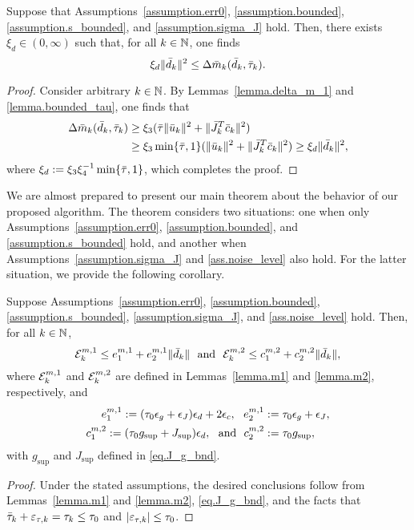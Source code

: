 \begin{lemma}\label{lemma.d_bounded_by_delta_m}
  Suppose that Assumptions~\ref{assumption.err0}, \ref{assumption.bounded}, \ref{assumption.s_bounded}, and \ref{assumption.sigma_J} hold. Then, there exists $\xi_d \in (0,\infty)$ such that, for all $k \in \mathbb{N}$, one finds
  \begin{equation*}
    \xi_d \|{\bar d}_k\|^2 \leq \Delta {\bar m}_k({\bar d}_k, {\bar \tau}_k).
  \end{equation*}
\end{lemma}
\begin{proof}
  Consider arbitrary $k \in \mathbb{N}$.  By Lemmas~\ref{lemma.delta_m_1} and \ref{lemma.bounded_tau}, one finds that
  \begin{align*}
    \Delta {\bar m}_k({\bar d}_k, {\bar \tau}_k)
    &\geq \xi_3 ({\bar \tau} \|{\bar u}_k\|^2 + \|{\bar J}_k^T {\bar c}_k\|^2) \\
    &\geq \xi_3 \min\{{\bar \tau},1\} (\|{\bar u}_k\|^2 + \|{\bar J}_k^T {\bar c}_k\|^2 ) \geq \xi_d \|{\bar d}_k \|^2,
  \end{align*}
  where $\xi_d := \xi_3 \xi_4^{-1} \min\{{\bar \tau},1\}$, which completes the proof.
\end{proof}

We are almost prepared to present our main theorem about the behavior of our proposed algorithm.  The theorem considers two situations: one when only Assumptions~\ref{assumption.err0}, \ref{assumption.bounded}, and \ref{assumption.s_bounded} hold, and another when Assumptions~\ref{assumption.sigma_J} and \ref{ass.noise_level} also hold.  For the latter situation, we provide the following corollary.

\begin{corollary}\label{cor.m1_m2_bound}
  Suppose Assumptions~\ref{assumption.err0}, \ref{assumption.bounded}, \ref{assumption.s_bounded}, \ref{assumption.sigma_J}, and \ref{ass.noise_level} hold.  Then, for all $k \in \mathbb{N}$,
  \begin{equation}\label{eq.m1_m2_bound}
    \calEkmone \leq \emOneOne + \emOneTwo \|\dtrue_k\|\ \ \text{and} \ \ \calEkmtwo \leq \emTwoOne + \emTwoTwo \|\dtrue_k\|,
  \end{equation}
  where $\mathcal{E}_k^{m, 1}$ and $\mathcal{E}_k^{m, 2}$ are defined in Lemmas~\ref{lemma.m1} and \ref{lemma.m2}, respectively, and
  \begin{align*}
    \emOneOne := (\tau_0 \eps_g + \eps_J) \eps_d + 2 \eps_c,\ \ 
    \emOneTwo &:= \tau_0 \eps_g + \eps_J, \\
    \emTwoOne := (\tau_0 g_{\sup} + J_{\sup} ) \eps_d,\ \ \text{and} \ \  
    \emTwoTwo &:= \tau_0 g_{\sup},
  \end{align*} 
  with $g_{\sup}$ and $J_{\sup}$ defined in \eqref{eq.J_g_bnd}.
\end{corollary}
\begin{proof}
  Under the stated assumptions, the desired conclusions follow from Lemmas~\ref{lemma.m1} and \ref{lemma.m2}, \eqref{eq.J_g_bnd}, and the facts that ${\bar \tau}_k + \varepsilon_{\tau,k} = \tau_k \leq \tau_0$ and $|\varepsilon_{\tau,k}| \leq \tau_0$.
\end{proof}

